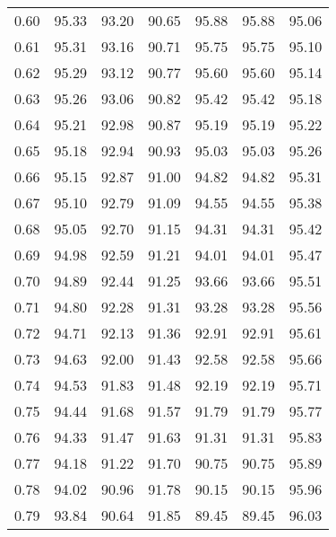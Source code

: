\begin{tabular}{|c|c|c|c|c|c|c|}
      0.60 &     95.33 &     93.20 &      90.65 &   95.88 &      95.88 &         95.06 \\
      0.61 &     95.31 &     93.16 &      90.71 &   95.75 &      95.75 &         95.10 \\
      0.62 &     95.29 &     93.12 &      90.77 &   95.60 &      95.60 &         95.14 \\
      0.63 &     95.26 &     93.06 &      90.82 &   95.42 &      95.42 &         95.18 \\
      0.64 &     95.21 &     92.98 &      90.87 &   95.19 &      95.19 &         95.22 \\
      0.65 &     95.18 &     92.94 &      90.93 &   95.03 &      95.03 &         95.26 \\
      0.66 &     95.15 &     92.87 &      91.00 &   94.82 &      94.82 &         95.31 \\
      0.67 &     95.10 &     92.79 &      91.09 &   94.55 &      94.55 &         95.38 \\
      0.68 &     95.05 &     92.70 &      91.15 &   94.31 &      94.31 &         95.42 \\
      0.69 &     94.98 &     92.59 &      91.21 &   94.01 &      94.01 &         95.47 \\
      0.70 &     94.89 &     92.44 &      91.25 &   93.66 &      93.66 &         95.51 \\
      0.71 &     94.80 &     92.28 &      91.31 &   93.28 &      93.28 &         95.56 \\
      0.72 &     94.71 &     92.13 &      91.36 &   92.91 &      92.91 &         95.61 \\
      0.73 &     94.63 &     92.00 &      91.43 &   92.58 &      92.58 &         95.66 \\
      0.74 &     94.53 &     91.83 &      91.48 &   92.19 &      92.19 &         95.71 \\
      0.75 &     94.44 &     91.68 &      91.57 &   91.79 &      91.79 &         95.77 \\
      0.76 &     94.33 &     91.47 &      91.63 &   91.31 &      91.31 &         95.83 \\
      0.77 &     94.18 &     91.22 &      91.70 &   90.75 &      90.75 &         95.89 \\
      0.78 &     94.02 &     90.96 &      91.78 &   90.15 &      90.15 &         95.96 \\
      0.79 &     93.84 &     90.64 &      91.85 &   89.45 &      89.45 &         96.03 \\

\end{tabular}
